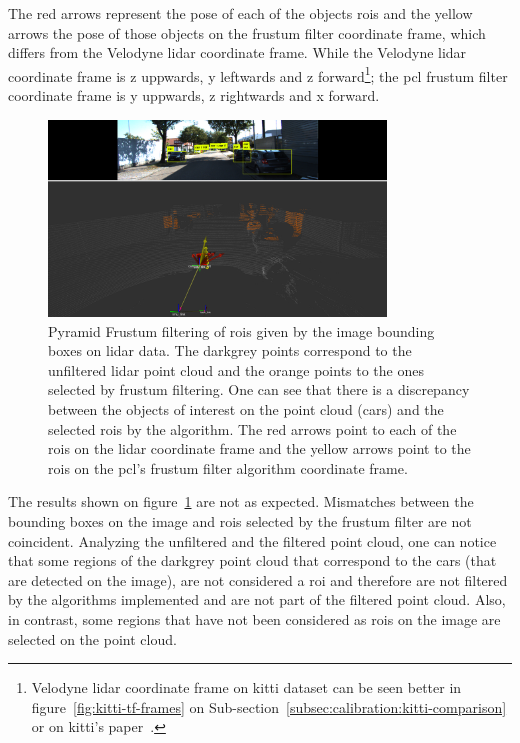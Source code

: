 The red arrows represent the pose of each of the objects \acp{roi} and the yellow arrows the pose of those objects on the frustum filter coordinate frame, which differs from the Velodyne \ac{lidar} coordinate frame. While the Velodyne \ac{lidar} coordinate frame is z uppwards, y leftwards and z forward\footnote{Velodyne \ac{lidar} coordinate frame on \ac{kitti} dataset can be seen better in figure~\ref{fig:kitti-tf-frames} on Sub-section~\ref{subsec:calibration:kitti-comparison} or on \ac{kitti}'s paper~\cite{Geiger2013a}.}; the \ac{pcl} frustum filter coordinate frame is y uppwards, z rightwards and x forward.

\begin{figure}[ht]
	\centering
	\includegraphics[width=0.8\textwidth]{img/image-object-to-point-cloud/bbox_correspondences_on_kitti.png}
	\caption{Pyramid Frustum filtering of \acp{roi} given by the image bounding boxes on \ac{lidar} data. The darkgrey points correspond to the unfiltered \ac{lidar} point cloud and the orange points to the ones selected by frustum filtering. One can see that there is a discrepancy between the objects of interest on the point cloud (cars) and the selected \acp{roi} by the algorithm. The red arrows point to each of the \acp{roi} on the \ac{lidar} coordinate frame and the yellow arrows point to the \acp {roi} on the \ac{pcl}'s frustum filter algorithm coordinate frame.}
	\label{fig:bbox-correspondences-on-kitti}
\end{figure}

The results shown on figure~\ref{fig:bbox-correspondences-on-kitti} are not as expected. Mismatches between the bounding boxes on the image and \acp{roi} selected by the frustum filter are not coincident. Analyzing the unfiltered and the filtered point cloud, one can notice that some regions of the darkgrey point cloud that correspond to the cars (that are detected on the image), are not considered a \ac{roi} and therefore are not filtered by the algorithms implemented and are not part of the filtered point cloud. Also, in contrast, some regions that have not been considered as \acp{roi} on the image are selected on the point cloud.

